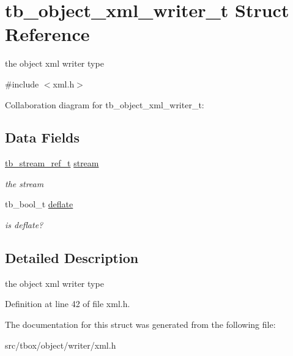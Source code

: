 \hypertarget{structtb__object__xml__writer__t}{\section{tb\-\_\-object\-\_\-xml\-\_\-writer\-\_\-t Struct Reference}
\label{structtb__object__xml__writer__t}
}


the object xml writer type  




{\ttfamily \#include $<$xml.\-h$>$}



Collaboration diagram for tb\-\_\-object\-\_\-xml\-\_\-writer\-\_\-t\-:
\subsection*{Data Fields}
\begin{DoxyCompactItemize}
\item 
\hypertarget{structtb__object__xml__writer__t_a7783f961f1d64707d00365a5a69376a5}{\hyperlink{structtb__stream__ref__t}{tb\-\_\-stream\-\_\-ref\-\_\-t} \hyperlink{structtb__object__xml__writer__t_a7783f961f1d64707d00365a5a69376a5}{stream}}\label{structtb__object__xml__writer__t_a7783f961f1d64707d00365a5a69376a5}

\begin{DoxyCompactList}\small\item\em the stream \end{DoxyCompactList}\item 
\hypertarget{structtb__object__xml__writer__t_a317b01d1aab59f46b0dcc4ed6db97135}{tb\-\_\-bool\-\_\-t \hyperlink{structtb__object__xml__writer__t_a317b01d1aab59f46b0dcc4ed6db97135}{deflate}}\label{structtb__object__xml__writer__t_a317b01d1aab59f46b0dcc4ed6db97135}

\begin{DoxyCompactList}\small\item\em is deflate? \end{DoxyCompactList}\end{DoxyCompactItemize}


\subsection{Detailed Description}
the object xml writer type 

Definition at line 42 of file xml.\-h.



The documentation for this struct was generated from the following file\-:\begin{DoxyCompactItemize}
\item 
src/tbox/object/writer/xml.\-h\end{DoxyCompactItemize}
